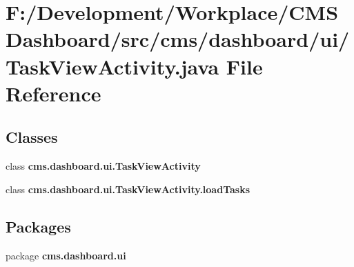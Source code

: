 \section{\-F\-:/\-Development/\-Workplace/\-C\-M\-S \-Dashboard/src/cms/dashboard/ui/\-Task\-View\-Activity.java \-File \-Reference}
\label{_task_view_activity_8java}
\subsection*{\-Classes}
\begin{DoxyCompactItemize}
\item 
class {\bf cms.\-dashboard.\-ui.\-Task\-View\-Activity}
\item 
class {\bf cms.\-dashboard.\-ui.\-Task\-View\-Activity.\-load\-Tasks}
\end{DoxyCompactItemize}
\subsection*{\-Packages}
\begin{DoxyCompactItemize}
\item 
package {\bf cms.\-dashboard.\-ui}
\end{DoxyCompactItemize}
